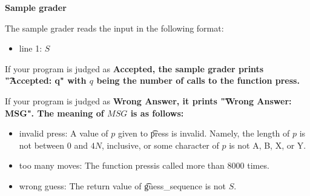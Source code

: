 \bf{Sample grader}

The sample grader reads the input in the following format:

\begin{itemize}
\item line 1: $S$
\end{itemize}

If your program is judged as \bf{Accepted}, the sample grader prints \t{"Accepted: q"} with $q$ being the number of calls to the function press.

If your program is judged as \bf{Wrong Answer}, it prints \t{"Wrong Answer: MSG"}. The meaning of $MSG$ is as follows:
\begin{itemize}
\item invalid press: A value of $p$ given to \t{press} is invalid. Namely, the length of $p$ is not between $0$ and $4N$, inclusive, or some character of $p$ is not A, B, X, or Y.
\item too many moves: The function pressis called more than 8000 times.
\item wrong guess: The return value of \t{guess_sequence} is not $S$.
\end{itemize}


